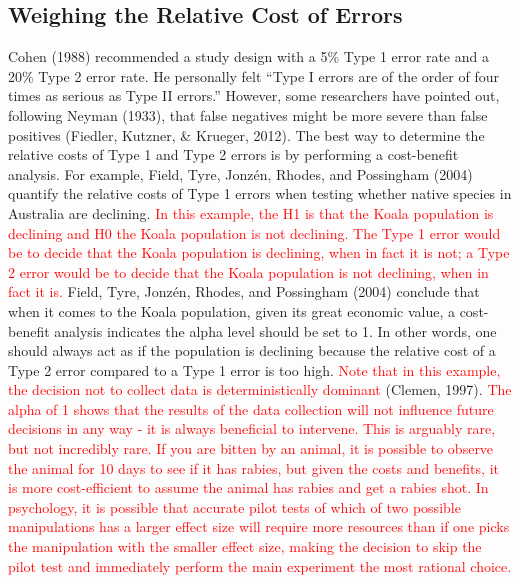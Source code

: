 \documentclass[
  english,
  ,man, a4paper,floatsintext]{apa6}
\begin{document}
\hypertarget{weighing-the-relative-cost-of-errors}{%
\subsection{Weighing the Relative Cost of Errors}\label{weighing-the-relative-cost-of-errors}}

Cohen (1988) recommended a study design with a 5\% Type 1 error rate and a 20\% Type 2 error rate. He personally felt ``Type I errors are of the order of four times as serious as Type II errors.'' However, some researchers have pointed out, following Neyman (1933), that false negatives might be more severe than false positives (Fiedler, Kutzner, \& Krueger, 2012). The best way to determine the relative costs of Type 1 and Type 2 errors is by performing a cost-benefit analysis. For example, Field, Tyre, Jonzén, Rhodes, and Possingham (2004) quantify the relative costs of Type 1 errors when testing whether native species in Australia are declining. \textcolor{red}{In this example, the H1 is that the Koala population is declining and H0 the Koala population is not declining. The Type 1 error would be to decide that the Koala population is declining, when in fact it is not; a Type 2 error would be to decide that the Koala population is not declining, when in fact it is.} Field, Tyre, Jonzén, Rhodes, and Possingham (2004) conclude that when it comes to the Koala population, given its great economic value, a cost-benefit analysis indicates the alpha level should be set to 1. In other words, one should always act as if the population is declining because the relative cost of a Type 2 error compared to a Type 1 error is too high.
\textcolor{red}{Note that in this example, the decision not to collect data is deterministically dominant} (Clemen, 1997). \textcolor{red}{The alpha of 1 shows that the results of the data collection will not influence future decisions in any way - it is always beneficial to intervene. This is arguably rare, but not incredibly rare. If you are bitten by an animal, it is possible to observe the animal for 10 days to see if it has rabies, but given the costs and benefits, it is more cost-efficient to assume the animal has rabies and get a rabies shot. In psychology, it is possible that accurate pilot tests of which of two possible manipulations has a larger effect size will require more resources than if one picks the manipulation with the smaller effect size, making the decision to skip the pilot test and immediately perform the main experiment the most rational choice.}
\end{document}
